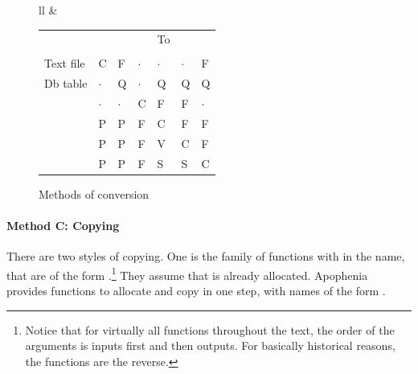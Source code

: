 \def\rcap#1{\rotatebox{45}{#1}\hskip -15pt }
\def\rcapc#1{\rotatebox{45}{\ci{#1}}\hskip -15pt }
\def\cd{$\cdot$}
\begin{figure} \begin{center}
\begin{tabular}{ll}
&
\begin{tabular}{lp{0.4cm}p{0.4cm}p{0.4cm}p{0.4cm}p{0.4cm}p{0.4cm}}
   &   &&&To\\
    & \rcap{Text file} & \rcap{Db table} & \rcapc{double[]} 
        & \rcapc{gsl\_vector} & \rcapc{gsl\_matrix}& \rcapc{apop\_data}\\
Text file               & C & F & \cd & \cd & \cd &  F                   \\
Db table                & \cd & Q & \cd & Q & Q & Q                  \\
\ci{double[ ]}      & \cd & \cd & C & F & F & \cd                  \\
\ci{gsl\_vector}   & P  & P & F & C & F & F                    \\
\ci{gsl\_matrix}   &  P & P & F & V &C &  F               \\
\ci{apop\_data}    & P & P & F & S & S &C
\end{tabular}
\end{tabular}
\caption{Methods of conversion} \label{conversiontab}
\end{center}\end{figure} 


\paragraph{Method C: Copying} There are two styles of copying.
One is the family of functions with  in the name, that are
of the form .\footnote{Notice that for virtually
all functions throughout the text, the order of the arguments is 
inputs first and then outputs. For basically historical reasons, the
 functions are the reverse.} They assume that 
is already allocated.  
Apophenia provides functions to allocate and copy in one step, with
names of the form .

